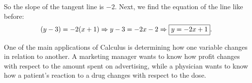 \documentclass{book}
\begin{document}
\begin{Exam}
\begin{enumerate}
So the slope of the tangent line is $-2$. Next, we find the equation of the line like before:
\[(y-3) = -2(x+1) \Rightarrow  y-3 = -2x-2 \Rightarrow \fbox{$y = -2x+1$}. \]
\end{enumerate}
\end{Exam}\vs


One of the main applications of Calculus is determining how one variable changes in relation to another. A marketing manager wants to know how profit changes with respect to the amount spent on advertising, while a physician wants to know how a patient's reaction to a drug changes with respect to the dose.

%
%
%
%
\end{document}
